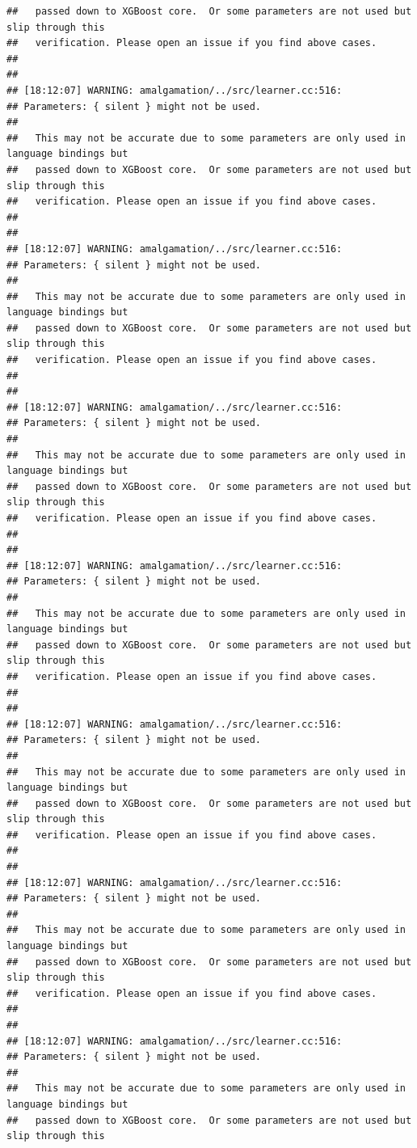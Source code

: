 \documentclass[AMS,STIX2COL]{WileyNJD-v2}\usepackage[]{graphicx}\usepackage[]{color}
\makeatletter
\newenvironment{kframe}{%
 \def\at@end@of@kframe{}%
 \ifinner\ifhmode%
  \def\at@end@of@kframe{\end{minipage}}%
  \begin{minipage}{\columnwidth}%
 \fi\fi%
 \def\FrameCommand##1{\hskip\@totalleftmargin \hskip-\fboxsep
 \colorbox{shadecolor}{##1}\hskip-\fboxsep
     \hskip-\linewidth \hskip-\@totalleftmargin \hskip\columnwidth}%
 \MakeFramed {\advance\hsize-\width
   \@totalleftmargin\z@ \linewidth\hsize
   \@setminipage}}%
 {\par\unskip\endMakeFramed%
 \at@end@of@kframe}
\newenvironment{knitrout}{}{} %
\makeatother
\begin{document}
\begin{knitrout}
\begin{kframe}
\begin{verbatim}
##   passed down to XGBoost core.  Or some parameters are not used but slip through this
##   verification. Please open an issue if you find above cases.
## 
## 
## [18:12:07] WARNING: amalgamation/../src/learner.cc:516: 
## Parameters: { silent } might not be used.
## 
##   This may not be accurate due to some parameters are only used in language bindings but
##   passed down to XGBoost core.  Or some parameters are not used but slip through this
##   verification. Please open an issue if you find above cases.
## 
## 
## [18:12:07] WARNING: amalgamation/../src/learner.cc:516: 
## Parameters: { silent } might not be used.
## 
##   This may not be accurate due to some parameters are only used in language bindings but
##   passed down to XGBoost core.  Or some parameters are not used but slip through this
##   verification. Please open an issue if you find above cases.
## 
## 
## [18:12:07] WARNING: amalgamation/../src/learner.cc:516: 
## Parameters: { silent } might not be used.
## 
##   This may not be accurate due to some parameters are only used in language bindings but
##   passed down to XGBoost core.  Or some parameters are not used but slip through this
##   verification. Please open an issue if you find above cases.
## 
## 
## [18:12:07] WARNING: amalgamation/../src/learner.cc:516: 
## Parameters: { silent } might not be used.
## 
##   This may not be accurate due to some parameters are only used in language bindings but
##   passed down to XGBoost core.  Or some parameters are not used but slip through this
##   verification. Please open an issue if you find above cases.
## 
## 
## [18:12:07] WARNING: amalgamation/../src/learner.cc:516: 
## Parameters: { silent } might not be used.
## 
##   This may not be accurate due to some parameters are only used in language bindings but
##   passed down to XGBoost core.  Or some parameters are not used but slip through this
##   verification. Please open an issue if you find above cases.
## 
## 
## [18:12:07] WARNING: amalgamation/../src/learner.cc:516: 
## Parameters: { silent } might not be used.
## 
##   This may not be accurate due to some parameters are only used in language bindings but
##   passed down to XGBoost core.  Or some parameters are not used but slip through this
##   verification. Please open an issue if you find above cases.
## 
## 
## [18:12:07] WARNING: amalgamation/../src/learner.cc:516: 
## Parameters: { silent } might not be used.
## 
##   This may not be accurate due to some parameters are only used in language bindings but
##   passed down to XGBoost core.  Or some parameters are not used but slip through this

\end{verbatim}
\end{kframe}
\end{knitrout}
\end{document}
